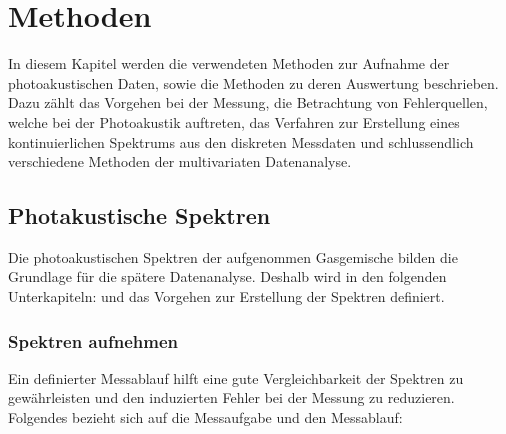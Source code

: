 \chapter{Methoden}

In diesem Kapitel werden die verwendeten Methoden zur Aufnahme der photoakustischen Daten, sowie die Methoden zu deren Auswertung beschrieben.
Dazu zählt das Vorgehen bei der Messung, die Betrachtung von Fehlerquellen, welche bei der Photoakustik auftreten, das Verfahren zur Erstellung eines kontinuierlichen Spektrums aus den diskreten Messdaten und schlussendlich verschiedene Methoden der multivariaten Datenanalyse. 

\section{Photakustische Spektren}
Die photoakustischen Spektren der aufgenommen Gasgemische bilden die Grundlage für die spätere Datenanalyse.
Deshalb wird in den folgenden Unterkapiteln:  und  das Vorgehen zur Erstellung der Spektren definiert.%

\subsection{Spektren aufnehmen} \label{Spektren aufnehmen}
Ein definierter Messablauf hilft eine gute Vergleichbarkeit der Spektren zu gewährleisten und den induzierten Fehler bei der Messung zu reduzieren.
Folgendes bezieht sich auf die Messaufgabe und den Messablauf:

